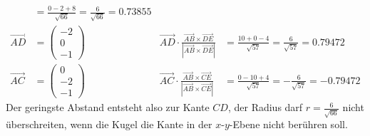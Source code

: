 \begin{loesung}
\begin{align*}
&=
\frac{0-2+8}{\sqrt{66}}=\frac6{\sqrt{66}}=0.73855
\\
\overrightarrow{AD}
&=
\begin{pmatrix}-2\\0\\-1\end{pmatrix}
&
\overrightarrow{AD}
\cdot
\frac{ \overrightarrow{AB}\times\overrightarrow{DE}}{|\overrightarrow{AB}\times\overrightarrow{DE}|}
&=
\frac{10+0-4}{\sqrt{57}}=\frac{6}{\sqrt{57}}=0.79472
\\
\overrightarrow{AC}
&=
\begin{pmatrix}0\\-2\\-1\end{pmatrix}
&
\overrightarrow{AC}
\cdot
\frac{ \overrightarrow{AB}\times\overrightarrow{CE}}{|\overrightarrow{AB}\times\overrightarrow{CE}|}
&=
\frac{0-10+4}{\sqrt{57}}=-\frac{6}{\sqrt{57}}=-0.79472
\end{align*}
Der geringste Abstand entsteht also zur Kante $CD$, der Radius darf
$r=\frac6{\sqrt{66}}$ nicht überschreiten, wenn die Kugel die Kante
in der $x$-$y$-Ebene nicht berühren soll.
\end{loesung}

